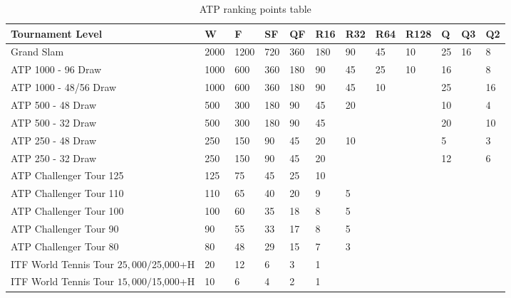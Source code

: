 \documentclass[12pt]{article}
\begin{document}
\begin{table}[ht]
  \caption{ATP ranking points table}
  \label{tab:ATP}
\centering
\begin{tabular}{
  |p{}
  |p{}
  |p{}
  |p{}
  |p{}
  |p{}
  |p{}
  |p{}
  |p{}
  |p{}
  |p{}
  |p{}|
  }
  \hline
Tournament Level & W & F & SF & QF & R16 & R32 & R64 & R128 & Q & Q3 & Q2\\ 
  \hline
Grand Slam & 2000 & 1200 & 720 & 360 & 180 & 90 & 45 & 10 & 25 & 16 & 8 \\ 
\hline
ATP 1000 - 96 Draw & 1000 & 600 & 360 & 180 & 90 & 45 & 25 & 10 & 16 &  & 8\\ 
\hline
ATP 1000 - 48/56 Draw & 1000 & 600 & 360 & 180 & 90 & 45 & 10 &  & 25 &  & 16\\
\hline
ATP 500 - 48 Draw & 500 & 300 & 180 & 90 & 45 & 20 &  &  & 10 &  & 4\\ 
\hline
ATP 500 - 32 Draw & 500 & 300 & 180 & 90 & 45 &  &  &  & 20 &  & 10\\ 
\hline
ATP 250 - 48 Draw & 250 & 150 & 90 & 45 & 20 & 10 &  &  & 5 &  & 3\\
\hline
ATP 250 - 32 Draw & 250 & 150 & 90 & 45 & 20 &  &  &  & 12 &  & 6\\
\hline
ATP Challenger Tour 125 & 125 & 75 & 45 & 25 & 10 & & & & & & \\
\hline
ATP Challenger Tour 110 & 110 & 65 & 40 & 20 & 9 & 5 & & & & & \\
\hline
ATP Challenger Tour 100 & 100 & 60 & 35 & 18 & 8 & 5 & & & & & \\
\hline
ATP Challenger Tour 90 & 90 & 55 & 33 & 17 & 8 & 5 & & & & & \\
\hline
ATP Challenger Tour 80 & 80 & 48 & 29 & 15 & 7 & 3 & & & & & \\
\hline
ITF World Tennis Tour $25,000 / $25,000+H & 20 & 12 & 6 & 3 & 1 & & & & & & \\
\hline
ITF World Tennis Tour $15,000 / $15,000+H & 10 & 6 & 4 & 2 & 1 & & & & & & \\
  \hline
\end{tabular}
\end{table}
\end{document}
